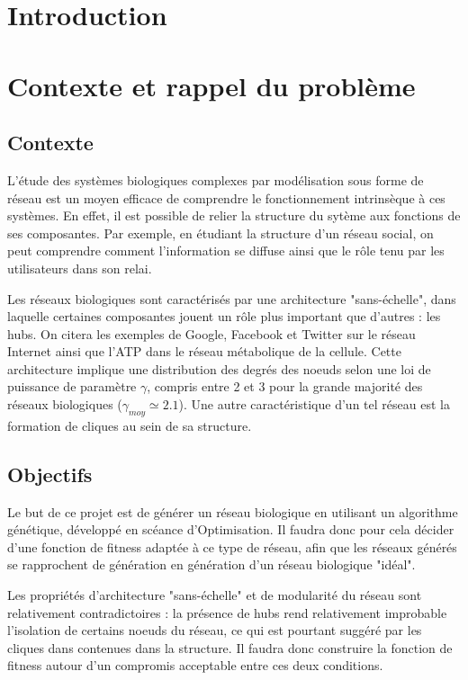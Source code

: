 


\maketitle

\section{Introduction}
 

\section{Contexte et rappel du problème}
\subsection{Contexte}
L'étude des systèmes biologiques complexes par modélisation sous forme de réseau est un moyen efficace de comprendre le fonctionnement intrinsèque à ces systèmes. En effet, il est possible de relier la structure du sytème aux fonctions de ses composantes. Par exemple, en étudiant la structure d'un réseau social, on peut comprendre comment l'information se diffuse ainsi que le rôle tenu par les utilisateurs dans son relai.

\medskip
Les réseaux biologiques sont caractérisés par une architecture "sans-échelle", dans laquelle certaines composantes jouent un rôle plus important que d'autres : les hubs. On citera les exemples de Google, Facebook et Twitter sur le réseau Internet ainsi que  l'ATP dans le réseau métabolique de la cellule. Cette architecture implique une distribution des degrés des noeuds selon une loi de puissance de paramètre $\gamma$, compris entre 2 et 3 pour la grande majorité des réseaux biologiques ($\gamma_{moy}\simeq 2.1$).
Une autre caractéristique d'un tel réseau est la formation de cliques au sein de sa structure. 

\subsection{Objectifs}
Le but de ce projet est de générer un réseau biologique en utilisant un algorithme génétique, développé en scéance d'Optimisation. Il faudra donc pour cela décider d'une fonction de fitness adaptée à ce type de réseau, afin que les réseaux générés se rapprochent de génération en génération d'un réseau biologique "idéal".

\medskip
Les propriétés d'architecture "sans-échelle" et de modularité du réseau sont relativement contradictoires : la présence de hubs rend relativement improbable l'isolation de certains noeuds du réseau, ce qui est pourtant suggéré par les cliques dans contenues dans la structure. Il faudra donc construire la fonction de fitness autour d'un compromis acceptable entre ces deux conditions.

